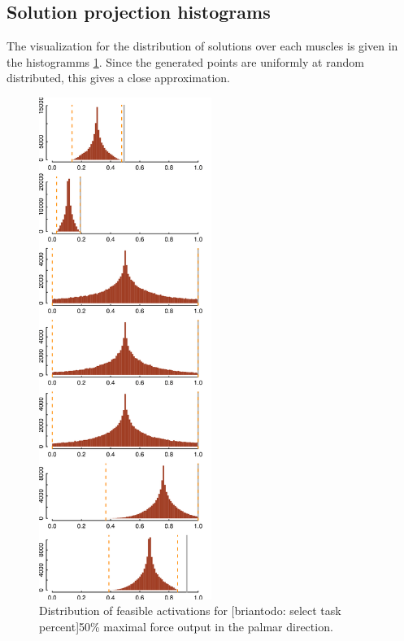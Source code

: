 \subsection{Solution projection histograms}
The visualization for the distribution of solutions over each muscles is given in the histogramms \ref{fig:raw_histograms}. Since the generated points are uniformly at random distributed, this gives a close approximation. %

\begin{figure}[htbp]
\centering
\includegraphics[width=0.5\textwidth]{sections/figs/raw_histograms.png}
\caption{Distribution of feasible activations for [briantodo: select task percent]50\% maximal force output in the palmar direction.}
\label{fig:raw_histograms}
\end{figure}

